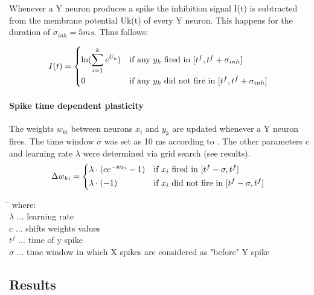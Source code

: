 Whenever a Y neuron produces a spike the inhibition signal I(t) is subtracted from the membrane potential Uk(t) of every Y neuron. This happens for the duration of $\sigma_{inh} = 5 ms$. Thus follows:

\begin{equation}
\label{eqn:iinh}
I(t) = \begin{dcases*} \ln ( \sum_{i=1}^k e^{U_k} ) & if any $y_k$ fired in $ [t^f, t^f  + \sigma_{inh}] $ \\
0 & \text{if any $y_k$ did not fire in $ [t^f, t^f + \sigma_{inh}] $ } \end{dcases*}\end{equation}

\paragraph{Spike time dependent plasticity}
The weights $w_{ki}$ between neurons $x_i$ and $y_k$ are updated whenever a Y neuron fires. The time window $\sigma$ was set as 10 ms according to \citet{nessler}. The other parameters c and learning rate $\lambda$ were determined via grid search (see results).
\begin{equation}
\label{deltawki}
\Delta w_{ki} = \begin{dcases*} \lambda \cdot (ce^{-w_{ki}} - 1) & if $x_{i}$ fired in $ [t^f - \sigma, t^f] $ \\
\lambda \cdot (-1) & \text{if $ x_i $ did not fire in $ [t^f - \sigma, t^f] $ } \end{dcases*}
\end{equation}
\begin{tabbing}
\phantom{$c\ $}\= \kill
where:\> \\
$\lambda$\> ... learning rate \\
c\> ... shifts weights values \\
$t^f$\> ... time of y spike \\
$\sigma$ ... time window in which X spikes are considered as "before" Y spike
\end{tabbing}


\subsection{Results}
